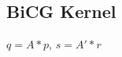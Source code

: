 \documentclass[11pt]{article}
\begin{document}
%



\subsection{BiCG Kernel}

$q = A * p$, $s = A' * r$
\end{document}
